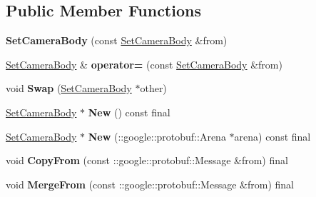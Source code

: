 \subsection*{Public Member Functions}
\begin{DoxyCompactItemize}
\item 
\mbox{\label{classtbBasics_1_1SetCameraBody_a0a78403f9b719b2aa0238c5fade7ff9f}} 
{\bfseries Set\+Camera\+Body} (const \hyperlink{classtbBasics_1_1SetCameraBody}{Set\+Camera\+Body} \&from)
\item 
\mbox{\label{classtbBasics_1_1SetCameraBody_ae1e1b44471923bb651cbde66e2c609e4}} 
\hyperlink{classtbBasics_1_1SetCameraBody}{Set\+Camera\+Body} \& {\bfseries operator=} (const \hyperlink{classtbBasics_1_1SetCameraBody}{Set\+Camera\+Body} \&from)
\item 
\mbox{\label{classtbBasics_1_1SetCameraBody_a8db02a85da27903ae755b22d6845c2a9}} 
void {\bfseries Swap} (\hyperlink{classtbBasics_1_1SetCameraBody}{Set\+Camera\+Body} $\ast$other)
\item 
\mbox{\label{classtbBasics_1_1SetCameraBody_acdaf73f7b543ccc55d5f4bef74f29e2e}} 
\hyperlink{classtbBasics_1_1SetCameraBody}{Set\+Camera\+Body} $\ast$ {\bfseries New} () const final
\item 
\mbox{\label{classtbBasics_1_1SetCameraBody_a801c334c79a6ca17fc626f022471fe04}} 
\hyperlink{classtbBasics_1_1SetCameraBody}{Set\+Camera\+Body} $\ast$ {\bfseries New} (\+::google\+::protobuf\+::\+Arena $\ast$arena) const final
\item 
\mbox{\label{classtbBasics_1_1SetCameraBody_a005385eee2cb835680fee510200b69fe}} 
void {\bfseries Copy\+From} (const \+::google\+::protobuf\+::\+Message \&from) final
\item 
\mbox{\label{classtbBasics_1_1SetCameraBody_a5bfbcfc38ce792890f88841a0164c496}} 
void {\bfseries Merge\+From} (const \+::google\+::protobuf\+::\+Message \&from) final
\item 
\mbox{\label{classtbBasics_1_1SetCameraBody_a74642af0e2c2ca5a5a3a57ba1e2db438}} 

\end{DoxyCompactItemize}
